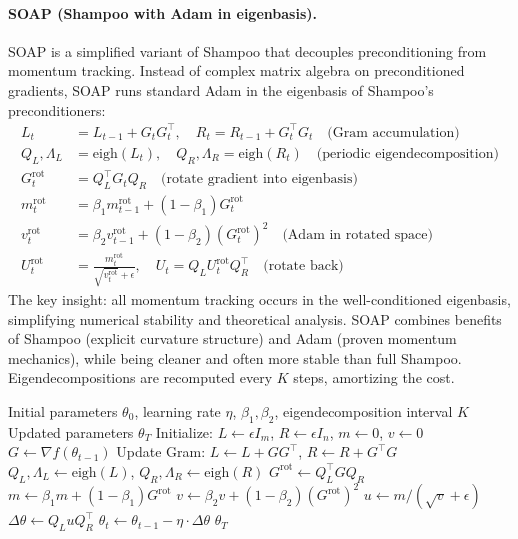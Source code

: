 \documentclass[11pt,a4paper]{article}
\begin{document}
\paragraph{SOAP (Shampoo with Adam in eigenbasis).}
SOAP is a simplified variant of Shampoo that decouples preconditioning from momentum tracking. Instead of complex matrix algebra on preconditioned gradients, SOAP runs standard Adam in the eigenbasis of Shampoo's preconditioners:
\begin{align}
L_t &= L_{t-1} + G_t G_t^\top, \quad R_t = R_{t-1} + G_t^\top G_t \quad\text{(Gram accumulation)} \\
Q_L, \Lambda_L &= \text{eigh}(L_t), \quad Q_R, \Lambda_R = \text{eigh}(R_t) \quad\text{(periodic eigendecomposition)} \\
G_t^{\text{rot}} &= Q_L^\top G_t Q_R \quad\text{(rotate gradient into eigenbasis)} \\
m_t^{\text{rot}} &= \beta_1 m_{t-1}^{\text{rot}} + (1-\beta_1) G_t^{\text{rot}} \\
v_t^{\text{rot}} &= \beta_2 v_{t-1}^{\text{rot}} + (1-\beta_2)(G_t^{\text{rot}})^2 \quad\text{(Adam in rotated space)} \\
U_t^{\text{rot}} &= \frac{m_t^{\text{rot}}}{\sqrt{v_t^{\text{rot}}}+\epsilon}, \quad U_t = Q_L U_t^{\text{rot}} Q_R^\top \quad\text{(rotate back)}
\end{align}
The key insight: all momentum tracking occurs in the well-conditioned eigenbasis, simplifying numerical stability and theoretical analysis. SOAP combines benefits of Shampoo (explicit curvature structure) and Adam (proven momentum mechanics), while being cleaner and often more stable than full Shampoo. Eigendecompositions are recomputed every $K$ steps, amortizing the cost.

\begin{algorithm}[H]
\caption{SOAP (Shampoo with Adam in Eigenbasis)}
\label{alg:soap}
\begin{algorithmic}[1]
\Require Initial parameters $\theta_0$, learning rate $\eta$, $\beta_1, \beta_2$, eigendecomposition interval $K$
\Ensure Updated parameters $\theta_T$
\State Initialize: $L \gets \epsilon I_m$, $R \gets \epsilon I_n$, $m \gets 0$, $v \gets 0$
    \State $G \gets \nabla f(\theta_{t-1})$ 
    \State Update Gram: $L \gets L + G G^\top$, $R \gets R + G^\top G$
        \State $Q_L, \Lambda_L \gets \text{eigh}(L)$, $Q_R, \Lambda_R \gets \text{eigh}(R)$
    \EndIf
    \State $G^{\text{rot}} \gets Q_L^\top G Q_R$ 
    \State $m \gets \beta_1 m + (1-\beta_1) G^{\text{rot}}$ 
    \State $v \gets \beta_2 v + (1-\beta_2) (G^{\text{rot}})^2$ 
    \State $u \gets m / (\sqrt{v} + \epsilon)$ 
    \State $\Delta \theta \gets Q_L u Q_R^\top$ 
    \State $\theta_t \gets \theta_{t-1} - \eta \cdot \Delta \theta$
\EndFor
\Return $\theta_T$
\end{algorithmic}
\end{algorithm}
\end{document}
